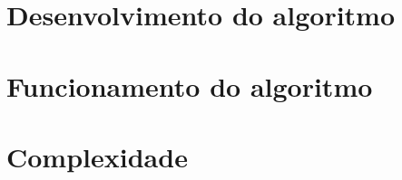 \section{Desenvolvimento do algoritmo}

\section{Funcionamento do algoritmo}

\section{Complexidade}